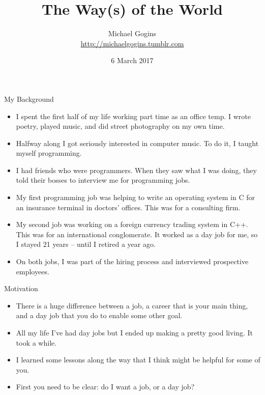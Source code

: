 \documentclass{beamer}
\title[The Way(s) of the World] %
{The Way(s) of the World}
\author[Gogins] %
{Michael Gogins\\
\url{http://michaelgogins.tumblr.com} 
}
\institute[Irreducible Productions] %
{
  Irreducible Productions\\
  New York
}
\date[6 March 2017] %
{6 March 2017}
\begin{document}

\begin{frame}
  \titlepage
\end{frame}

\begin{frame}{My Background}
  \begin{itemize}
  \item
    I spent the first half of my life working part time as an office temp. I wrote poetry, played music, and did street photography on my own time.
  \item
    Halfway along I got seriously interested in computer music. To do it, I taught myself programming.
  \item
    I had friends who were programmers. When they saw what I was doing, they told their bosses to interview me for programming jobs.
  \item 
    My first programming job was helping to write an operating system in C for an insurance terminal in doctors' offices. This was for a consulting firm.
  \item
    My second job was working on a foreign currency trading system in C++. This was for an international conglomerate. It worked as a day job for me, so I stayed 21 years -- until I retired a year ago.
  \item
    On both jobs, I was part of the hiring process and interviewed prospective employees.
  \end{itemize}
\end{frame}


\begin{frame}{Motivation}
  \begin{itemize}
  \item
    There is a huge difference between a job, a career that is your main thing, and a day job that you do to enable some other goal.
  \item
    All my life I've had day jobs but I ended up making a pretty good living. It took a while.
  \item
    I learned some lessons along the way that I think might be helpful for some of you. 
  \item
    First you need to be clear: do I want a job, or a day job?
  \end{itemize}
\end{frame}
\end{document}
